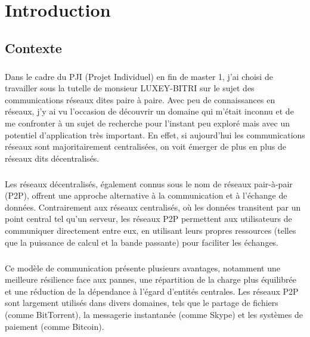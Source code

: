 \chapter{Introduction}

\section{Contexte}

\paragraph{}

Dans le cadre du PJI (Projet Individuel) en fin de master 1, j'ai choisi de travailler sous la tutelle de monsieur LUXEY-BITRI sur le sujet des communications réseaux dites paire à paire.
Avec peu de connaissances en réseaux, j'y ai vu l'occasion de découvrir un domaine qui m'était inconnu et de me confronter à un sujet de recherche pour l'instant peu exploré mais 
avec un potentiel d'application très important. En effet, si aujourd'hui les communications réseaux sont majoritairement centralisées, on voit émerger de plus en plus de réseaux
dits décentralisés. 

\paragraph{}
Les réseaux décentralisés, également connus sous le nom de réseaux pair-à-pair (P2P), offrent une approche alternative à la communication et à l'échange de données. Contrairement aux réseaux centralisés, 
où les données transitent par un point central tel qu'un serveur, les réseaux P2P permettent aux utilisateurs de communiquer directement entre eux, en utilisant leurs propres ressources 
(telles que la puissance de calcul et la bande passante) pour faciliter les échanges.

\paragraph{}
Ce modèle de communication présente plusieurs avantages, notamment une meilleure résilience face aux pannes, une répartition de la charge plus équilibrée et une réduction de la dépendance 
à l'égard d'entités centrales. Les réseaux P2P sont largement utilisés dans divers domaines, tels que le partage de fichiers (comme BitTorrent), la messagerie instantanée (comme Skype) 
et les systèmes de paiement (comme Bitcoin).

\newpage

